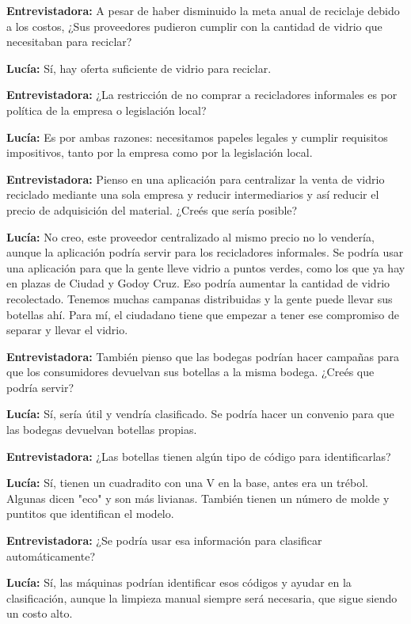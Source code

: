 \textbf{Entrevistadora:} A pesar de haber disminuido la meta anual de reciclaje debido a los costos, ¿Sus proveedores pudieron cumplir con la cantidad de vidrio que necesitaban para reciclar?

\textbf{Lucía:} Sí, hay oferta suficiente de vidrio para reciclar.

\textbf{Entrevistadora:} ¿La restricción de no comprar a recicladores informales es por política de la empresa o legislación local?

\textbf{Lucía:} Es por ambas razones: necesitamos papeles legales y cumplir requisitos impositivos, tanto por la empresa como por la legislación local.

\textbf{Entrevistadora:} Pienso en una aplicación para centralizar la venta de vidrio reciclado mediante una sola empresa y reducir intermediarios y así reducir el precio de adquisición del material. ¿Creés que sería posible?

\textbf{Lucía:} No creo, este proveedor centralizado al mismo precio no lo vendería, aunque la aplicación podría servir para los recicladores informales. Se podría usar una aplicación para que la gente lleve vidrio a puntos verdes, como los que ya hay en plazas de Ciudad y Godoy Cruz. Eso podría aumentar la cantidad de vidrio recolectado. Tenemos muchas campanas distribuidas y la gente puede llevar sus botellas ahí. Para mí, el ciudadano tiene que empezar a tener ese compromiso de separar y llevar el vidrio.

\textbf{Entrevistadora:} También pienso que las bodegas podrían hacer campañas para que los consumidores devuelvan sus botellas a la misma bodega. ¿Creés que podría servir?

\textbf{Lucía:} Sí, sería útil y vendría clasificado. Se podría hacer un convenio para que las bodegas devuelvan botellas propias.

\textbf{Entrevistadora:} ¿Las botellas tienen algún tipo de código para identificarlas?

\textbf{Lucía:} Sí, tienen un cuadradito con una V en la base, antes era un trébol. Algunas dicen "eco" y son más livianas. También tienen un número de molde y puntitos que identifican el modelo.

\textbf{Entrevistadora:} ¿Se podría usar esa información para clasificar automáticamente?

\textbf{Lucía:} Sí, las máquinas podrían identificar esos códigos y ayudar en la clasificación, aunque la limpieza manual siempre será necesaria, que sigue siendo un costo alto.

